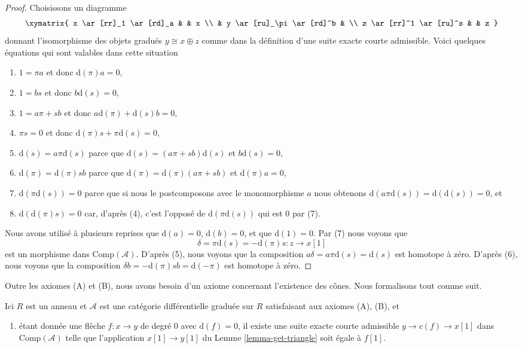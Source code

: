\begin{proof}
Choisissons un diagramme
$$
\xymatrix{
x \ar[rr]_1 \ar[rd]_a & & x \\
& y \ar[ru]_\pi \ar[rd]^b & \\
z \ar[rr]^1 \ar[ru]^s & & z
}
$$
donnant l'isomorphisme des objets gradués $y \cong x \oplus z$ comme dans la
définition d'une suite exacte courte admissible. Voici quelques équations qui sont
valables dans cette situation
\begin{enumerate}
\item $1 = \pi a$ et donc $\text{d}(\pi) a = 0$,
\item $1 = b s$ et donc $b \text{d}(s) = 0$,
\item $1 = a \pi + s b$ et donc $a \text{d}(\pi) + \text{d}(s) b = 0$,
\item $\pi s = 0$ et donc $\text{d}(\pi)s + \pi \text{d}(s) = 0$,
\item $\text{d}(s) = a \pi \text{d}(s)$ parce que $\text{d}(s) = (a \pi + s
b)\text{d}(s)$ et $b\text{d}(s) = 0$,
\item $\text{d}(\pi) = \text{d}(\pi) s b$ parce que $\text{d}(\pi) =
\text{d}(\pi)(a \pi + s b)$ et $\text{d}(\pi)a = 0$,
\item $\text{d}(\pi \text{d}(s)) = 0$ parce que si nous le postcomposons avec le
monomorphisme $a$ nous obtenons $\text{d}(a\pi \text{d}(s)) =
\text{d}(\text{d}(s)) = 0$, et
\item $\text{d}(\text{d}(\pi)s) = 0$ car, d'après (4), c'est l'opposé de
$\text{d}(\pi\text{d}(s))$ qui est $0$ par (7).
\end{enumerate}
Nous avons utilisé à plusieurs reprises que $\text{d}(a) = 0$, $\text{d}(b) = 0$,
et que $\text{d}(1) = 0$. Par (7) nous voyons que
$$
\delta = \pi \text{d}(s) = - \text{d}(\pi) s : z \to x[1]
$$
est un morphisme dans $\text{Comp}(\mathcal{A})$. D'après (5), nous voyons que la
composition $a \delta = a \pi \text{d}(s) = \text{d}(s)$ est homotope à zéro.
D'après (6), nous voyons que la composition $\delta b = - \text{d}(\pi)sb =
\text{d}(-\pi)$ est homotope à zéro.
\end{proof}

\noindent
Outre les axiomes (A) et (B), nous avons besoin d'un axiome concernant l'existence
des cônes. Nous formalisons tout comme suit.

\begin{situation}
\label{situation-ABC}
Ici $R$ est un anneau et $\mathcal{A}$ est une catégorie différentielle graduée
sur $R$ satisfaisant aux axiomes (A), (B), et
\begin{enumerate}
\item[(C)] étant donnée une flèche $f : x \to y$ de degré $0$ avec $\text{d}(f) =
0$, il existe une suite exacte courte admissible $y \to c(f) \to x[1]$ dans
$\text{Comp}(\mathcal{A})$ telle que l'application $x[1] \to y[1]$ du Lemme
\ref{lemma-get-triangle} soit égale à $f[1]$.
\end{enumerate}
\end{situation}

